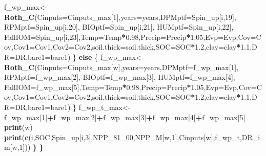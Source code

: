 \documentclass[
  10pt,
  b5paper,
]{book}
\newenvironment{Shaded}{\begin{snugshade}}{\end{snugshade}}
\newcommand{\ControlFlowTok}[1]{\textcolor[rgb]{0.13,0.29,0.53}{\textbf{#1}}}
\newcommand{\DataTypeTok}[1]{\textcolor[rgb]{0.13,0.29,0.53}{#1}}
\newcommand{\DecValTok}[1]{\textcolor[rgb]{0.00,0.00,0.81}{#1}}
\newcommand{\ErrorTok}[1]{\textcolor[rgb]{0.64,0.00,0.00}{\textbf{#1}}}
\newcommand{\FloatTok}[1]{\textcolor[rgb]{0.00,0.00,0.81}{#1}}
\newcommand{\KeywordTok}[1]{\textcolor[rgb]{0.13,0.29,0.53}{\textbf{#1}}}
\newcommand{\NormalTok}[1]{#1}
\newcommand{\OperatorTok}[1]{\textcolor[rgb]{0.81,0.36,0.00}{\textbf{#1}}}
\begin{document}
\begin{Shaded}
\begin{Highlighting}[]
\NormalTok{f_wp_max<-}\KeywordTok{Roth_C}\NormalTok{(}\DataTypeTok{Cinputs=}\NormalTok{Cinputs_max[}\DecValTok{1}\NormalTok{],}\DataTypeTok{years=}\NormalTok{years,}\DataTypeTok{DPMptf=}\NormalTok{Spin_up[i,}\DecValTok{19}\NormalTok{], }\DataTypeTok{RPMptf=}\NormalTok{Spin_up[i,}\DecValTok{20}\NormalTok{], }\DataTypeTok{BIOptf=}\NormalTok{Spin_up[i,}\DecValTok{21}\NormalTok{], }\DataTypeTok{HUMptf=}\NormalTok{Spin_up[i,}\DecValTok{22}\NormalTok{], }\DataTypeTok{FallIOM=}\NormalTok{Spin_up[i,}\DecValTok{23}\NormalTok{],}\DataTypeTok{Temp=}\NormalTok{Temp}\OperatorTok{*}\FloatTok{0.98}\NormalTok{,}\DataTypeTok{Precip=}\NormalTok{Precip}\OperatorTok{*}\FloatTok{1.05}\NormalTok{,}\DataTypeTok{Evp=}\NormalTok{Evp,}\DataTypeTok{Cov=}\NormalTok{Cov,}\DataTypeTok{Cov1=}\NormalTok{Cov1,}\DataTypeTok{Cov2=}\NormalTok{Cov2,}\DataTypeTok{soil.thick=}\NormalTok{soil.thick,}\DataTypeTok{SOC=}\NormalTok{SOC}\OperatorTok{*}\FloatTok{1.2}\NormalTok{,}\DataTypeTok{clay=}\NormalTok{clay}\OperatorTok{*}\FloatTok{1.1}\NormalTok{,}\DataTypeTok{DR=}\NormalTok{DR,}\DataTypeTok{bare1=}\NormalTok{bare1)}
\NormalTok{\} }\ControlFlowTok{else}\NormalTok{ \{}
\NormalTok{f_wp_max<-}\KeywordTok{Roth_C}\NormalTok{(}\DataTypeTok{Cinputs=}\NormalTok{Cinputs_max[w],}\DataTypeTok{years=}\NormalTok{years,}\DataTypeTok{DPMptf=}\NormalTok{f_wp_max[}\DecValTok{1}\NormalTok{], }\DataTypeTok{RPMptf=}\NormalTok{f_wp_max[}\DecValTok{2}\NormalTok{], }\DataTypeTok{BIOptf=}\NormalTok{f_wp_max[}\DecValTok{3}\NormalTok{], }\DataTypeTok{HUMptf=}\NormalTok{f_wp_max[}\DecValTok{4}\NormalTok{], }\DataTypeTok{FallIOM=}\NormalTok{f_wp_max[}\DecValTok{5}\NormalTok{],}\DataTypeTok{Temp=}\NormalTok{Temp}\OperatorTok{*}\FloatTok{0.98}\NormalTok{,}\DataTypeTok{Precip=}\NormalTok{Precip}\OperatorTok{*}\FloatTok{1.05}\NormalTok{,}\DataTypeTok{Evp=}\NormalTok{Evp,}\DataTypeTok{Cov=}\NormalTok{Cov,}\DataTypeTok{Cov1=}\NormalTok{Cov1,}\DataTypeTok{Cov2=}\NormalTok{Cov2,}\DataTypeTok{soil.thick=}\NormalTok{soil.thick,}\DataTypeTok{SOC=}\NormalTok{SOC}\OperatorTok{*}\FloatTok{1.2}\NormalTok{,}\DataTypeTok{clay=}\NormalTok{clay}\OperatorTok{*}\FloatTok{1.1}\NormalTok{,}\DataTypeTok{DR=}\NormalTok{DR,}\DataTypeTok{bare1=}\NormalTok{bare1)}
\NormalTok{\}}
\NormalTok{f_wp_t_max<-f_wp_max[}\DecValTok{1}\NormalTok{]}\OperatorTok{+}\NormalTok{f_wp_max[}\DecValTok{2}\NormalTok{]}\OperatorTok{+}\NormalTok{f_wp_max[}\DecValTok{3}\NormalTok{]}\OperatorTok{+}\NormalTok{f_wp_max[}\DecValTok{4}\NormalTok{]}\OperatorTok{+}\NormalTok{f_wp_max[}\DecValTok{5}\NormalTok{]}
\KeywordTok{print}\NormalTok{(w)}
\KeywordTok{print}\NormalTok{(}\KeywordTok{c}\NormalTok{(i,SOC,Spin_up[i,}\DecValTok{3}\NormalTok{],NPP_}\DecValTok{81}\NormalTok{_}\DecValTok{00}\NormalTok{,NPP_M[w,}\DecValTok{1}\NormalTok{],Cinputs[w],f_wp_t,DR_im[w,}\DecValTok{1}\NormalTok{]))}
\ErrorTok{\}}
\ErrorTok{\}}
\end{Highlighting}
\end{Shaded}
\end{document}
